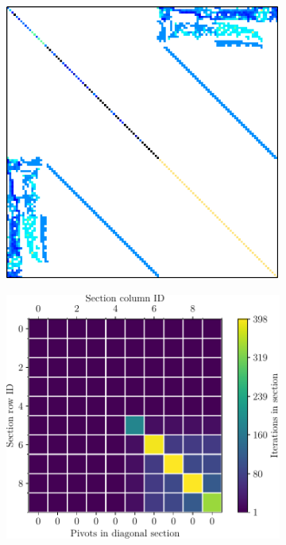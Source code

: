 \begin{figure}[ht!]
	\centering
	\begin{subfigure}[t]{0.45\textwidth}
		\centering
		\includegraphics[width=\textwidth, keepaspectratio]{images/ch03/input-matrices/decomposition-benchmarks/c-22.pdf}
		\label{Figure:comparing-decomposers-and-solvers->decomposition-project-benchmarks->decomposers-benchmark->comparison-of-execution-times-on-subset-of-matrices->matrix->c-22->nonzero-element-pattern}
	\end{subfigure}\hspace{0.03\textwidth}
	\begin{subfigure}[t]{0.51\textwidth}
		\centering
		\includegraphics[width=\textwidth, keepaspectratio, clip]{images/ch03/input-matrices/decomposition-benchmarks/c-22_icmxpp_metrics.pdf}

\end{subfigure}
\end{figure}
